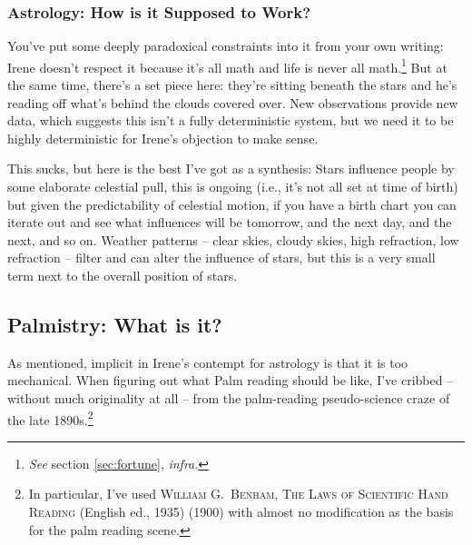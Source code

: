 \documentclass[../FGP.tex]{subfiles}
\begin{document}
\subsubsection{Astrology: How is it Supposed to Work?}
You've put some deeply paradoxical constraints into it from your own writing: Irene doesn't respect it because it's all math and life is never all math.\footnote{\textit{See} section \ref{sec:fortune}, \textit{infra}.} But at the same time, there's a set piece here: they're sitting beneath the stars and he's reading off what's behind the clouds covered over. New observations provide new data, which suggests this isn't a fully deterministic system, but we need it to be highly deterministic for Irene's objection to make sense. 

This sucks, but here is the best I've got as a synthesis: Stars influence people by some elaborate celestial pull, this is ongoing (i.e., it's not all set at time of birth) but given the predictability of celestial motion, if you have a birth chart you can iterate out and see what influences will be tomorrow, and the next day, and the next, and so on. Weather patterns -- clear skies, cloudy skies, high refraction, low refraction -- filter and can alter the influence of stars, but this is a very small term next to the overall position of stars.
\subsection{Palmistry: What is it?} 
As mentioned, implicit in Irene's contempt for astrology is that it is too mechanical. When figuring out what Palm reading should be like, I've cribbed -- without much originality at all -- from the palm-reading pseudo-science craze of the late 1890s.\footnote{In particular, I've used \textsc{William G.~Benham}, \textsc{The Laws of Scientific Hand Reading} (English ed., 1935) (1900) with almost no modification as the basis for the palm reading scene.}
\end{document}
